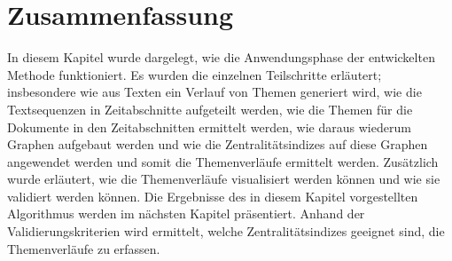 \section{Zusammenfassung}
In diesem Kapitel wurde dargelegt, wie die Anwendungsphase der entwickelten Methode funktioniert. Es wurden die einzelnen Teilschritte erläutert; insbesondere wie aus Texten ein Verlauf von Themen generiert wird, wie die Textsequenzen in Zeitabschnitte aufgeteilt werden, wie die Themen für die Dokumente in den Zeitabschnitten ermittelt werden, wie daraus wiederum Graphen aufgebaut werden und wie die Zentralitätsindizes auf diese Graphen angewendet werden und somit die Themenverläufe ermittelt werden. Zusätzlich wurde erläutert, wie die Themenverläufe visualisiert werden können und wie sie validiert werden können. Die Ergebnisse des in diesem Kapitel vorgestellten Algorithmus werden im nächsten Kapitel präsentiert. Anhand der Validierungskriterien wird ermittelt, welche Zentralitätsindizes geeignet sind, die Themenverläufe zu erfassen.